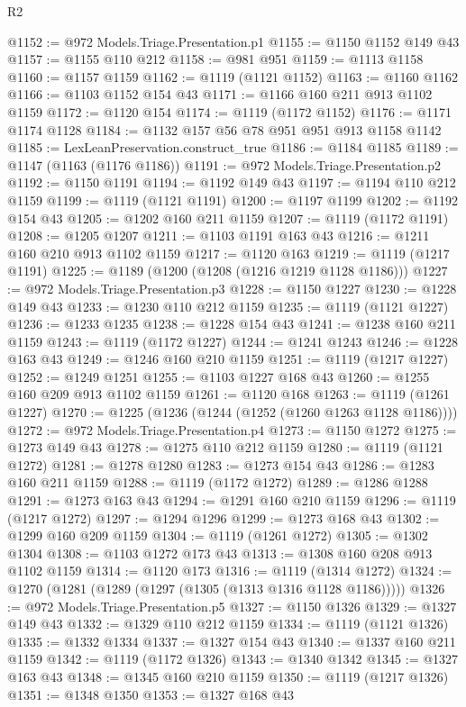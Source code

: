 \begin{lexlean}{R2}
\begin{coremodule}
{{{{{{{{{{{{{{{{{{{{{{{{{{{{{{{{{{{{{{{{{{{@1152 := @972 Models.Triage.Presentation.p1
@1155 := @1150 @1152 @149 @43
@1157 := @1155 @110 @212
@1158 := @981 @951
@1159 := @1113 @1158
@1160 := @1157 @1159
@1162 := @1119 (@1121 @1152)
@1163 := @1160 @1162
@1166 := @1103 @1152 @154 @43
@1171 := @1166 @160 @211 @913 @1102 @1159
@1172 := @1120 @154
@1174 := @1119 (@1172 @1152)
@1176 := @1171 @1174 @1128
@1184 := @1132 @157 @56 @78 @951 @951 @913 @1158 @1142
@1185 := LexLeanPreservation.construct_true
@1186 := @1184 @1185
@1189 := @1147 (@1163 (@1176 @1186))
@1191 := @972 Models.Triage.Presentation.p2
@1192 := @1150 @1191
@1194 := @1192 @149 @43
@1197 := @1194 @110 @212 @1159
@1199 := @1119 (@1121 @1191)
@1200 := @1197 @1199
@1202 := @1192 @154 @43
@1205 := @1202 @160 @211 @1159
@1207 := @1119 (@1172 @1191)
@1208 := @1205 @1207
@1211 := @1103 @1191 @163 @43
@1216 := @1211 @160 @210 @913 @1102 @1159
@1217 := @1120 @163
@1219 := @1119 (@1217 @1191)
@1225 := @1189 (@1200 (@1208 (@1216 @1219 @1128 @1186)))
@1227 := @972 Models.Triage.Presentation.p3
@1228 := @1150 @1227
@1230 := @1228 @149 @43
@1233 := @1230 @110 @212 @1159
@1235 := @1119 (@1121 @1227)
@1236 := @1233 @1235
@1238 := @1228 @154 @43
@1241 := @1238 @160 @211 @1159
@1243 := @1119 (@1172 @1227)
@1244 := @1241 @1243
@1246 := @1228 @163 @43
@1249 := @1246 @160 @210 @1159
@1251 := @1119 (@1217 @1227)
@1252 := @1249 @1251
@1255 := @1103 @1227 @168 @43
@1260 := @1255 @160 @209 @913 @1102 @1159
@1261 := @1120 @168
@1263 := @1119 (@1261 @1227)
@1270 := @1225 (@1236 (@1244 (@1252 (@1260 @1263 @1128 @1186))))
@1272 := @972 Models.Triage.Presentation.p4
@1273 := @1150 @1272
@1275 := @1273 @149 @43
@1278 := @1275 @110 @212 @1159
@1280 := @1119 (@1121 @1272)
@1281 := @1278 @1280
@1283 := @1273 @154 @43
@1286 := @1283 @160 @211 @1159
@1288 := @1119 (@1172 @1272)
@1289 := @1286 @1288
@1291 := @1273 @163 @43
@1294 := @1291 @160 @210 @1159
@1296 := @1119 (@1217 @1272)
@1297 := @1294 @1296
@1299 := @1273 @168 @43
@1302 := @1299 @160 @209 @1159
@1304 := @1119 (@1261 @1272)
@1305 := @1302 @1304
@1308 := @1103 @1272 @173 @43
@1313 := @1308 @160 @208 @913 @1102 @1159
@1314 := @1120 @173
@1316 := @1119 (@1314 @1272)
@1324 := @1270 (@1281 (@1289 (@1297 (@1305 (@1313 @1316 @1128 @1186)))))
@1326 := @972 Models.Triage.Presentation.p5
@1327 := @1150 @1326
@1329 := @1327 @149 @43
@1332 := @1329 @110 @212 @1159
@1334 := @1119 (@1121 @1326)
@1335 := @1332 @1334
@1337 := @1327 @154 @43
@1340 := @1337 @160 @211 @1159
@1342 := @1119 (@1172 @1326)
@1343 := @1340 @1342
@1345 := @1327 @163 @43
@1348 := @1345 @160 @210 @1159
@1350 := @1119 (@1217 @1326)
@1351 := @1348 @1350
@1353 := @1327 @168 @43
}}}}}}}}}}}}}}}}}}}}}}}}}}}}}}}}}}}}}}}}}}}
\end{coremodule}
\end{lexlean}
